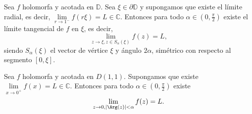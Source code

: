 \begin{theorem}
    Sea $f$ holomorfa y acotada en $\mathbb{D}$.
    Sea $\xi \in \partial \mathbb{D}$ y supongamos que existe el límite radial, es decir, $\lim\limits_{r \to 1^-} f(r\xi) = L \in \mathbb{C}$.
    Entonces para todo $\alpha \in (0, \frac{\pi}{2})$ existe el límite tangencial de $f$ en $\xi$, es decir,
    $$\lim\limits_{z \to \xi, z \in S_\alpha(\xi)} f(z) = L,$$
    siendo $S_\alpha(\xi)$ el vector de vértice $\xi$ y ángulo $2\alpha$, simétrico con respecto al segmento $[0, \xi]$.
\end{theorem}

\begin{theorem}
    Sea $f$ holomorfa y acotada en $D(1, 1)$.
    Supongamos que existe $\lim\limits_{x \to 0^+} f(x) = L \in \mathbb{C}$.
    Entonces para todo $\alpha \in (0, \frac{\pi}{2})$ existe
    $$\lim\limits_{z \to 0, |\Arg(z)| < \alpha} f(z) = L.$$
\end{theorem}

